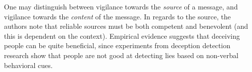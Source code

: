 One may distinguish between vigilance towards the \emph{source} of a message, and vigilance towards the \emph{content} of the message.
In regards to the source, the authors note that reliable sources must be both competent and benevolent (and this is dependent on the context).
Empirical evidence suggests that deceiving people can be quite beneficial, since experiments from deception detection research show that people are not good at detecting lies based on non-verbal behavioral cues.




